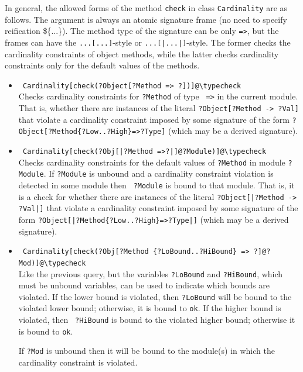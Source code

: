 \documentclass[11pt]{article}
\newcommand{\bs}{\textbackslash}
\begin{document}
In general, the allowed forms of the method {\tt check} in class
{\tt Cardinality}  are as
follows.  The argument is always an atomic signature frame (no need to specify
reification \$\{...\}).  The method type of the signature can be only
{\tt =>}, but the frames can have the \texttt{...[...]}-style or
\texttt{...[|...|]}-style. The former checks the cardinality
constraints of object methods, while the latter checks
cardinality constraints only for the default values of the methods.
\begin{itemize}
\item
  {\tt
    Cardinality[check(?Object[?Method => ?])]@\bs{}typecheck}
  \\ 
  Checks cardinality constraints for {\tt ?Method} of type {\tt
    =>} in the current module.
  That is, whether there are instances of the literal \texttt{?Object[?Method ->
    ?Val]} that violate a cardinality constraint imposed by some signature
  of the form \texttt{?Object[?Method\{?Low..?High\}=>?Type]} (which may be a
  derived signature).
\item
  {\tt
    Cardinality[check(?Obj[|?Method =>?|]@?Module)]@\bs{}typecheck}\\ 
  Checks cardinality constraints for the default values
  of {\tt ?Method} in module {\tt ?Module}. If {\tt ?Module} is unbound and a
  cardinality constraint violation is detected in some module then {\tt
    ?Module} is bound to that module.  
  That is, it is a check for
   whether there are instances of the literal \texttt{?Object[|?Method ->
     ?Val|]} that violate a cardinality constraint imposed by some signature
   of the form \texttt{?Object[|?Method\{?Low..?High\}=>?Type|]} (which may be a
  derived signature).
 \item {\tt
    Cardinality[check(?Obj[?Method \{?LoBound..?HiBound\} => ?]@?Mod)]@\bs{}typecheck}\\
  Like the previous query, but the variables {\tt ?LoBound} and
  {\tt ?HiBound}, which must be unbound variables, can be used to
  indicate which bounds are violated.  If the lower bound is violated, then
  {\tt ?LoBound} will be bound to the violated lower bound; otherwise, it
  is bound to {\tt ok}.  If the higher bound is violated, then {\tt
    ?HiBound} is bound to the violated higher bound; otherwise it is
  bound to {\tt ok}. 

  If {\tt ?Mod} is unbound then it will be bound to the module(s) in which
  the cardinality constraint is violated.


\end{itemize}
\end{document}
